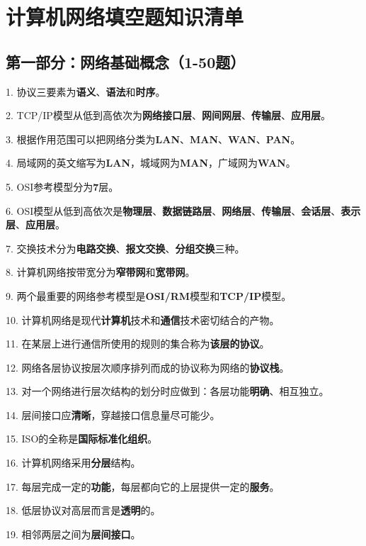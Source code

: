 \documentclass[12pt,a4paper,openany]{ctexbook}
\begin{document}
\chapter{计算机网络填空题知识清单}

\section{第一部分：网络基础概念（1-50题）}

1. 协议三要素为\textbf{语义}、\textbf{语法}和\textbf{时序}。

2. TCP/IP模型从低到高依次为\textbf{网络接口层}、\textbf{网间网层}、\textbf{传输层}、\textbf{应用层}。

3. 根据作用范围可以把网络分类为\textbf{LAN}、\textbf{MAN}、\textbf{WAN}、\textbf{PAN}。

4. 局域网的英文缩写为\textbf{LAN}，城域网为\textbf{MAN}，广域网为\textbf{WAN}。

5. OSI参考模型分为\textbf{7}层。

6. OSI模型从低到高依次是\textbf{物理层}、\textbf{数据链路层}、\textbf{网络层}、\textbf{传输层}、\textbf{会话层}、\textbf{表示层}、\textbf{应用层}。

7. 交换技术分为\textbf{电路交换}、\textbf{报文交换}、\textbf{分组交换}三种。

8. 计算机网络按带宽分为\textbf{窄带网}和\textbf{宽带网}。

9. 两个最重要的网络参考模型是\textbf{OSI/RM}模型和\textbf{TCP/IP}模型。

10. 计算机网络是现代\textbf{计算机}技术和\textbf{通信}技术密切结合的产物。

11. 在某层上进行通信所使用的规则的集合称为\textbf{该层的协议}。

12. 网络各层协议按层次顺序排列而成的协议称为网络的\textbf{协议栈}。

13. 对一个网络进行层次结构的划分时应做到：各层功能\textbf{明确}、相互独立。

14. 层间接口应\textbf{清晰}，穿越接口信息量尽可能少。

15. ISO的全称是\textbf{国际标准化组织}。

16. 计算机网络采用\textbf{分层}结构。

17. 每层完成一定的\textbf{功能}，每层都向它的上层提供一定的\textbf{服务}。

18. 低层协议对高层而言是\textbf{透明}的。

19. 相邻两层之间为\textbf{层间接口}。
\end{document}
